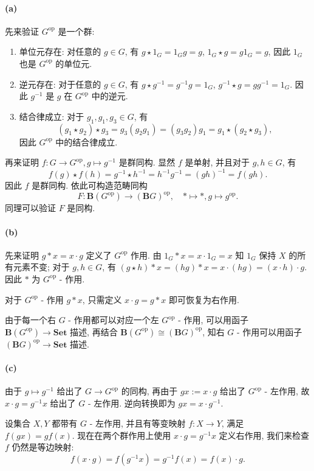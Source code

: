 \documentclass{article}
\newcommand{\op}{^{\mathrm{op}}}
\begin{document}
\begin{solution}
	\paragraph{(a)} 先来验证 $G\op$ 是一个群: 
	\begin{enumerate}[label = (\arabic*)]
		\item 单位元存在: 对任意的 $g \in G$, 有 $g \star 1_G = 1_Gg = g$, $1_G \star g = g1_G = g$, 因此 $1_G$ 也是 $G\op$ 的单位元.
		\item 逆元存在: 对于任意的 $g \in G$, 有 $g \star g^{-1} = g^{-1}g = 1_G$, $g^{-1} \star g = gg^{-1} = 1_G$. 因此 $g^{-1}$ 是 $g$ 在 $G\op$ 中的逆元.
		\item 结合律成立: 对于 $g_1, g_1, g_3 \in G$, 有
		\[ (g_1 \star g_2) \star g_3 = g_3(g_2g_1) = (g_3g_2)g_1 = g_1 \star (g_2 \star g_3), \]
		因此 $G\op$ 中的结合律成立.
	\end{enumerate}
	再来证明 $f: G \to G\op, g \mapsto g^{-1}$ 是群同构. 显然 $f$ 是单射, 并且对于 $g, h \in G$, 有
	\[ f(g) \star f(h) = g^{-1}\star h^{-1} = h^{-1} g^{-1} = (gh)^{-1} = f(gh). \]
	因此 $f$ 是群同构. 依此可构造范畴同构
	\[ F: \mathbf{B}(G\op) \to (\mathbf{B}G)\op, \quad 
	* \mapsto *, g \mapsto g\op. \]
	同理可以验证 $F$ 是同构.

	\paragraph{(b)} 先来证明 $g*x = x\cdot g$ 定义了 $G\op$ 作用. 由 $1_G * x = x \cdot 1_G = x$ 知 $1_G$ 保持 $X$ 的所有元素不变; 对于 $g, h \in G$, 有 $(g \star h) * x = (hg) * x = x \cdot (hg) = (x \cdot h) \cdot g$. 因此 $*$ 为 $G\op$ - 作用.

	对于 $G\op$ - 作用 $g*x$, 只需定义 $x \cdot g = g*x$ 即可恢复为右作用.

	由于每一个右 $G$ - 作用都可以对应一个左 $G\op$ - 作用, 可以用函子 $\mathbf{B}(G\op) \to \mathbf{Set}$ 描述, 再结合 $\mathbf{B}(G\op) \cong (\mathbf{B}G)\op$, 知右 $G$ - 作用可以用函子 $(\mathbf{B}G)\op \to \mathbf{Set}$ 描述.

	\paragraph{(c)} 由于 $g \mapsto g^{-1}$ 给出了 $G \to G\op$ 的同构, 再由于 $gx := x \cdot g$ 给出了 $G\op$ - 左作用, 故 $x \cdot g = g^{-1} x$ 给出了 $G$ - 左作用. 逆向转换即为 $gx = x \cdot g^{-1}$. 

	设集合 $X,Y$ 都带有 $G$ - 左作用, 并且有等变映射 $f: X \to Y$, 满足 $f(gx) = gf(x)$. 现在在两个群作用上使用 $x\cdot g =g^{-1} x$ 定义右作用, 我们来检查 $f$ 仍然是等边映射: 
	\[ f(x \cdot g) = f(g^{-1}x) = g^{-1} f(x) = f(x) \cdot g. \]
\end{solution}
\end{document}
